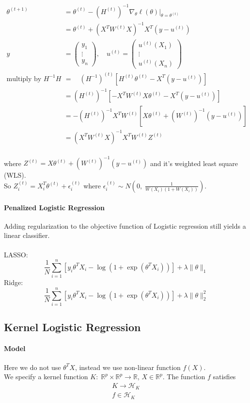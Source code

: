 \documentclass[12pt]{book}
\theoremstyle{definition}
\theoremstyle{remark}
\newcommand{\R}{\mathbb{R}}
\begin{document}
\[\begin{aligned}
\theta^{(t+1)} &= \theta^{(t)} - \left(H^{(t)}\right)^{-1}\nabla_\theta \ell(\theta)\big|_{\theta=\theta^{(t)}} \\
&= \theta^{(t)} + \left(X^T W^{(t)} X\right)^{-1}X^T\left(y - u^{(t)}\right)\\
y &= \begin{pmatrix}y_1 \\ \vdots \\ y_n\end{pmatrix},\quad u^{(t)}=\begin{pmatrix}u^{(t)}(X_1) \\ \vdots \\ u^{(t)}(X_n)\end{pmatrix}\\
\text{multiply by }H^{-1}H \quad&=\quad (H^{-1})^{(t)}\left[H^{(t)}\theta^{(t)}-X^T(y-u^{(t)})\right]\\
&= (H^{(t)})^{-1}\left[-X^T W^{(t)}X\theta^{(t)} - X^T(y - u^{(t)})\right]\\
&= -(H^{(t)})^{-1}X^TW^{(t)}\left[X\theta^{(t)} + (W^{(t)})^{-1}(y-u^{(t)})\right]\\
&= (X^T W^{(t)}X)^{-1}X^T W^{(t)}Z^{(t)}\\
\end{aligned}\]

where $Z^{(t)} = X\theta^{(t)} + (W^{(t)})^{-1}(y-u^{(t)})$ and it's weighted least square (WLS).\\
So $Z_i^{(t)} = X_i^T\theta^{(t)} + \epsilon_i^{(t)}$ where $\epsilon_i^{(t)}\sim N\left(0,\;\frac{1}{W(X_i)(1+W(X_i))}\right)$.

\paragraph{Penalized Logistic Regression}
Adding regularization to the objective function of Logistic regression still yields a linear classifier.\\
\\
LASSO:
\[ \frac1N\sum_{i=1}^n [y_i \theta^TX_i - \log (1+\exp (\theta^TX_i))]+\lambda\|\theta\|_1\]
Ridge: 
\[ \frac1N\sum_{i=1}^n [y_i \theta^TX_i - \log (1+\exp (\theta^TX_i))]+\lambda\|\theta\|_2^2\]


\subsection{Kernel Logistic Regression}
\paragraph{Model}
Here we do not use $\theta^TX$, instead we use non-linear function $f(X)$. \\
We specify a kernel function $K: \;\R^p\times \R^p \rightarrow \R$, $X\in \R^p$. The function $f$ satisfies
\[\begin{aligned}
    K\rightarrow\mathcal{H}_K\\f\in \mathcal{H}_K
\end{aligned}\]
\end{document}
